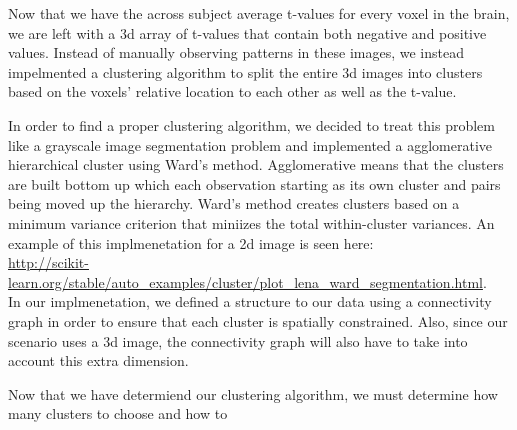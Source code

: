 \par Now that we have the across subject average t-values for every voxel in the brain, we are left with a 3d array of t-values that contain both negative and positive values. Instead of manually observing patterns in these images, we instead impelmented a clustering algorithm to split the entire 3d images into clusters based on the voxels' relative location to each other as well as the t-value. 

\par In order to find a proper clustering algorithm, we decided to treat this problem like a grayscale image segmentation problem and implemented a agglomerative hierarchical cluster using Ward's method. Agglomerative means that the clusters are built bottom up which each observation starting as its own cluster and pairs being moved up the hierarchy. Ward's method creates clusters based on a minimum variance criterion that miniizes the total within-cluster variances. An example of this implmenetation for a 2d image is seen here:
\\
\url{http://scikit-learn.org/stable/auto_examples/cluster/plot_lena_ward_segmentation.html}.\\ 

In our implmenetation, we defined a structure to our data using a connectivity graph in order to ensure that each cluster is spatially constrained. Also, since our scenario uses a 3d image, the connectivity graph will also have to take into account this extra dimension. 

\par Now that we have determiend our clustering algorithm, we must determine how many clusters to choose and how to 




